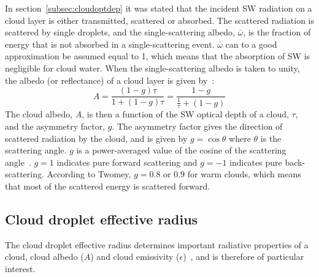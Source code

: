 In section~\ref{subsec:cloudoptdep} it was stated that the incident SW radiation on a cloud layer is either transmitted, scattered or absorbed. The scattered radiation is scattered by single droplets, and the single-scattering albedo, $\overline{\omega}$, is the fraction of energy that is not absorbed in a single-scattering event. $\overline{\omega}$ can to a good approximation be assumed equal to 1, which means that the absorption of SW is negligible for cloud water. When the single-scattering albedo is taken to unity, the albedo (or reflectance) of a cloud layer is given by~\citep{Hobbs1993}:
\begin{equation}
A = \frac{(1-g)\tau}{1+(1-g)\tau} = \frac{1-g}{\frac{1}{\tau}+(1-g)}
\label{eqn:cloudalbedo}
\end{equation}
The cloud albedo, $A$, is then a function of the SW optical depth of a cloud, $\tau$, and the asymmetry factor, $g$. The asymmetry factor gives the direction of scattered radiation by the cloud, and is given by $g=\overline{\cos \theta}$ where $\theta$ is the scattering angle. $g$ is a power-averaged value of the cosine of the scattering angle~\citep{Twomey1974}. $g=1$ indicates pure forward scattering and $g=-1$ indicates pure back-scattering. According to Twomey, $g=0.8$ or $0.9$ for warm clouds, which means that most of the scattered energy is scattered forward.




\subsection{Cloud droplet effective radius}
\label{subsec:effectiveradius}
The cloud droplet effective radius determines important radiative properties of a cloud, cloud albedo ($A$) and cloud emissivity ($\epsilon$)~\citep{Hansen1974}, and is therefore of particular interest. 

